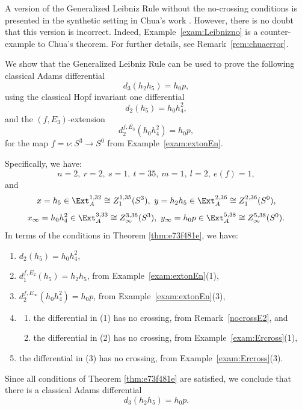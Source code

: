 \documentclass{amsart}
\numberwithin{equation}{section}
\begin{document}
\begin{remark}
    A version of the Generalized Leibniz Rule without the no-crossing conditions is presented in the synthetic setting in Chua's work \cite[Theorem~12.9]{Chua}. However, there is no doubt that this version is incorrect. Indeed, Example~\ref{exam:Leibnizno} is a counter-example to Chua's theorem. For further details, see Remark~\ref{rem:chuaerror}.
\end{remark}

\begin{example} \label{exam:Leibnizyes}
 We show that the Generalized Leibniz Rule can be used to prove the following classical Adams differential
    $$d_3(h_2 h_5) = h_0 p,$$
    using the classical Hopf invariant one differential
    $$d_2(h_5) = h_0 h_4^2,$$
    and the $(f, E_3)$-extension
        $$d_2^{f, E_3} (h_0h_4^2) = h_0 p,$$
        for the map $f = \nu: S^3 \rightarrow S^0$ from Example~\ref{exam:extonEn}.

        Specifically, we have:
        $$n=2, \ r=2, \ s=1, \ t=35, \ m=1, \ l=2, \ e(f)=1,$$
        and 
        $$x=h_5 \in \Ext_A^{1,32} \cong Z_1^{1,35}(S^3), \ y=h_2h_5 \in \Ext_A^{2,36} \cong Z_1^{2,36}(S^0),$$
        $$x_\infty=h_0h_4^2 \in \Ext_A^{3,33} \cong Z_\infty^{3,36}(S^3), \ y_\infty=h_0p \in \Ext_A^{5,38} \cong Z_\infty^{5,38}(S^0).$$
In terms of the conditions in Theorem \ref{thm:e73f481e}, we have:
      \begin{enumerate}
      \item $d_2(h_5) = h_0h_4^2$,
      \item $d_1^{f, E_2}(h_5) = h_2h_5$, from Example~\ref{exam:extonEn}(1),
      \item $d_2^{f, E_\infty} (h_0h_4^2) = h_0 p$, from Example~\ref{exam:extonEn}(3),
      \item 
      \begin{enumerate}
          \item the differential in (1) has no crossing, from Remark~\ref{nocrossE2}, and
          \item the differential in (2) has no crossing, from Example~\ref{exam:Ercross}(1), 
      \end{enumerate}
      \item the differential in (3) has no crossing, from Example~\ref{exam:Ercross}(3).
      \end{enumerate}
      Since all conditions of Theorem \ref{thm:e73f481e} are satisfied, we conclude that there is a classical Adams differential
      $$d_3(h_2 h_5) = h_0 p.$$
\end{example}
\end{document}
